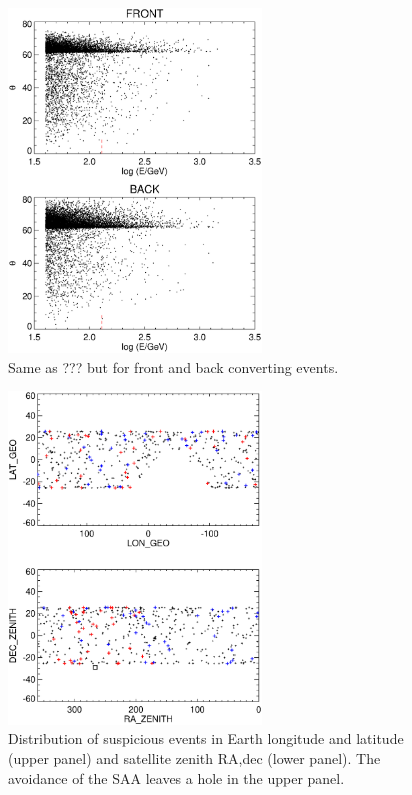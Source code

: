 \documentclass[aps,twocolumn,prd,superscriptaddress,showpacs,nofootinbib,fixfloat]{revtex4}
\begin{document}
\begin{figure}[p]
\centering
\includegraphics[width=0.6\textwidth]{plots/theta-E-frontback.ps}
\caption{Same as ??? but for front and back converting events.}
\label{fig:theta-E-frontback}
\end{figure}

\begin{figure}[p]
\centering
\includegraphics[width=0.6\textwidth]{plots/geo-lonlat.ps}
\caption{Distribution of suspicious events in Earth longitude and latitude
(upper panel) and satellite zenith RA,dec (lower panel).   The
avoidance of the SAA leaves a hole in the upper panel.}
\label{fig:geo-lonlat}
\end{figure}
\end{document}
